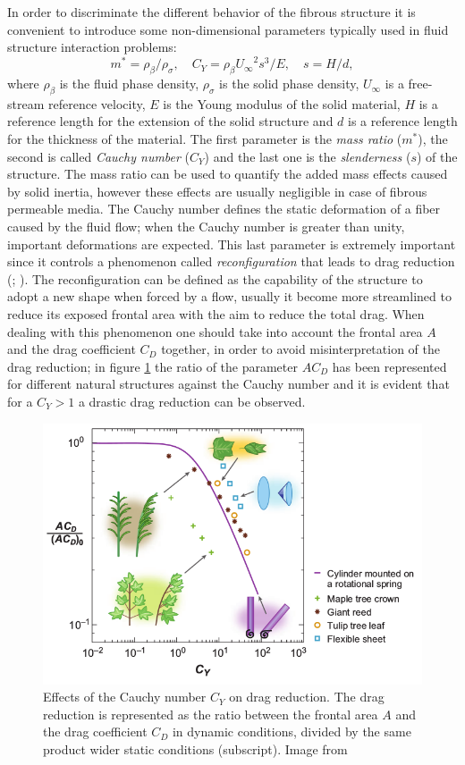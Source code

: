 In order to discriminate the different behavior of the fibrous structure it is convenient to introduce some non-dimensional parameters typically used in fluid structure interaction problems:
$$ m^* = \rho_{\beta} / \rho_{\sigma}, \quad C_Y= \rho_{\beta} {U_{\infty}}^2 s^3 / E, \quad s = H/d, $$
where $\rho_{\beta}$ is the fluid phase density, $\rho_{\sigma}$ is the solid phase density, $U_{\infty}$ is a free-stream reference velocity, $E$ is the Young modulus of the solid material, $H$ is a reference length for the extension of the solid structure and $d$ is a reference length for the thickness of the material.
The first parameter is the \textit{mass ratio} ($m^*$), the second is called \textit{Cauchy number} ($C_Y$) and the last one is the \textit{slenderness} ($s$) of the structure.
The mass ratio can be used to quantify the added mass effects caused by solid inertia, however these effects are usually negligible in case of fibrous permeable media.
The Cauchy number defines the static deformation of a fiber caused by the fluid flow; when the Cauchy number is greater than unity, important deformations are expected.
This last parameter is extremely important since it controls a phenomenon called \textit{reconfiguration} that leads to drag reduction (\citet{gosselin2011drag};  \citet{alvarado2017nature}).
The reconfiguration can be defined as the capability of the structure to adopt a new shape when forced by a flow, usually it become more streamlined to reduce its exposed frontal area with the aim to reduce the total drag.
When dealing with this phenomenon one should take into account the frontal area $A$ and the drag coefficient $C_D$ together, in order to avoid misinterpretation of the drag reduction; in figure \ref{fig:cycd} the ratio of the parameter $AC_D$ has been represented for different natural structures against the Cauchy number and it is evident that for a $C_Y>1$ a drastic drag reduction can be observed.

\begin{figure}[h]
	\centering
	\includegraphics[width=0.7\linewidth]{chapter_1/cy_cd}
	\caption{Effects of the Cauchy number $C_Y$ on drag reduction. The drag reduction is represented as the ratio between the frontal area $A$ and the drag coefficient $C_D$ in dynamic conditions, divided by the same product wider static conditions (subscript). Image from \citet{de2008effects}}
	\label{fig:cycd}
\end{figure}

